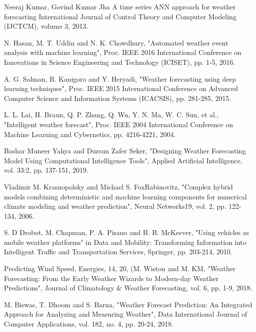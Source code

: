 \begin{}
\noindent[12] Neeraj Kumar, Govind Kumar Jha
A time series ANN approach for weather forecasting
International Journal of Control Theory and Computer Modeling (IJCTCM), volume 3, 2013.

\noindent[13] N. Hasan, M. T. Uddin and N. K. Chowdhury, "Automated weather event analysis with machine learning", Proc. IEEE 2016 International Conference on Innovations in Science Engineering and Technology (ICISET), pp. 1-5, 2016.

\noindent[14] A. G. Salman, B. Kanigoro and Y. Heryadi, "Weather forecasting using deep learning techniques", Proc. IEEE 2015 International Conference on Advanced Computer Science and Information Systems (ICACSIS), pp. 281-285, 2015.

\noindent[15]L. L. Lai, H. Braun, Q. P. Zhang, Q. Wu, Y. N. Ma, W. C. Sun, et al., "Intelligent weather forecast", Proc. IEEE 2004 International Conference on Machine Learning and Cybernetics, pp. 4216-4221, 2004.

\noindent [16]Bashar Muneer Yahya and Dursun Zafer Seker, "Designing Weather Forecasting Model Using Computational Intelligence Tools", Applied Artificial Intelligence, vol. 33:2, pp. 137-151, 2019.

\noindent[17]Vladimir M. Krasnopolsky and Michael S. FoxRabinovitz, "Complex hybrid models combining deterministic and machine learning components for numerical climate modeling and weather prediction", Neural Networks19, vol. 2, pp. 122-134, 2006.

\noindent[18] S. D Drobot, M. Chapman, P. A. Pisano and B. B. McKeever, "Using vehicles as mobile weather platforms" in Data and Mobility: Transforming Information into Intelligent Traffic and Transportation Services, Springer, pp. 203-214, 2010.

\noindent [19] Predicting Wind Speed, Energies, 14, 20, (M. Wiston and M. KM, "Weather Forecasting: From the Early Weather Wizards to Modern-day Weather Predictions", Journal of Climatology & Weather Forecasting, vol. 6, pp. 1-9, 2018.

\noindent[20]M. Biswas, T. Dhoom and S. Barna, "Weather Forecast Prediction: An Integrated Approach for Analyzing and Measuring Weather", Data International Journal of Computer Applications, vol. 182, no. 4, pp. 20-24, 2018.
\end{}



